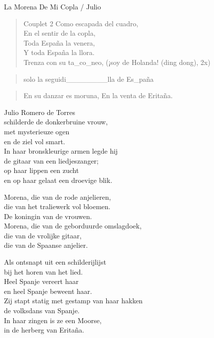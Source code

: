 \begin{song}{La Morena De Mi Copla / Julio}

\begin{verse}{Couplet 2}
Como escapada del cuadro,\\
En el sentir de la copla,\\
Toda España la venera,\chord{}\\
Y toda España la llora.\\
Trenza con su ta\_co\_neo, (¡soy de Holanda! \small{(ding dong)}, 2x)
\end{verse}

\begin{verse}{solo}
la seguidi\_\_\_\_\_\_\_\_lla de Es\_paña
\end{verse}

\begin{verse}{}
En su danzar es moruna,\hspace{4em}
En la venta de Eritaña.

\end{verse}
\end{song}

\begin{translation}
Julio Romero de Torres\\
schilderde de donkerbruine vrouw,\\
met mysterieuze ogen\\
en de ziel vol smart.\\
In haar bronskleurige armen legde hij\\
de gitaar van een liedjeszanger;\\
op haar lippen een zucht\\
en op haar gelaat een droevige blik.\vspace{\wlskip}

Morena, die van de rode anjelieren,\\
die van het traliewerk vol bloemen.\\
De koningin van de vrouwen.\\
Morena, die van de geborduurde omslagdoek,\\
die van de vrolijke gitaar,\\
die van de Spaanse anjelier.\vspace{\wlskip}

Als ontsnapt uit een schilderijlijst\\
bij het horen van het lied.\\
Heel Spanje vereert haar\\
en heel Spanje beweent haar.\\
Zij stapt statig met gestamp van haar hakken\\
de volksdans van Spanje.\\
In haar zingen is ze een Moorse,\\
in de herberg van Eritaña.
\end{translation}
